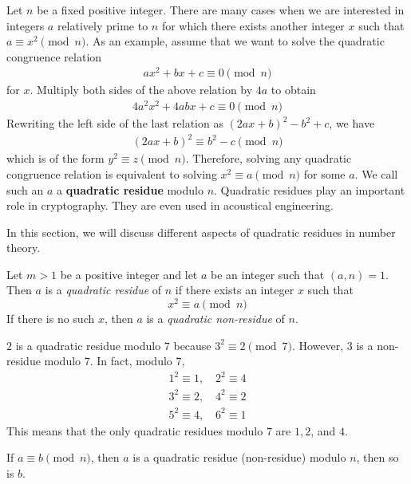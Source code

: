 \documentclass[main.tex]{subfile}
\begin{document}
	Let $n$ be a fixed positive integer. There are many cases when we are interested in integers $a$ relatively prime to $n$ for which there exists another integer $x$ such that $a \equiv x^2 \pmod n$. As an example, assume that we want to solve the quadratic congruence relation
	\begin{align*}
		ax^2 + bx + c \equiv 0 \pmod n
	\end{align*}
	for $x$. Multiply both sides of the above relation by $4a$ to obtain
	\begin{align*}
		4a^2x^2+4abx+c \equiv 0 \pmod n
	\end{align*}
	Rewriting the left side of the last relation as $(2ax+b)^2 -b^2+c$, we have
	\begin{align*}
		(2ax+b)^2 \equiv b^2-c \pmod n
	\end{align*}
	which is of the form $y^2 \equiv z \pmod n$. Therefore, solving any quadratic congruence relation is equivalent to solving $x^2 \equiv a \pmod n$ for some $a$. We call such an $a$ a \textbf{quadratic residue} modulo $n$. Quadratic residues play an important role in cryptography. They are even used in acoustical engineering.

	In this section, we will discuss different aspects of quadratic residues in number theory.

	\begin{definition}
		Let $m>1$ be a positive integer and let $a$ be an integer such that $(a,n)=1$. Then $a$ is a \textit{quadratic residue} of $n$ if there exists an integer $x$ such that
		\[x^2\equiv a\pmod n\]
		If there is no such $x$, then $a$ is a \textit{quadratic non-residue} of $n$.
	\end{definition}

	\begin{example}
		$2$ is a quadratic residue modulo $7$ because $3^2 \equiv 2 \pmod 7$. However, $3$ is a non-residue modulo $7$. In fact, modulo $7$,
		\begin{align*}
			1^2 \equiv 1, \quad 2^2 \equiv 4\\
			3^2 \equiv 2, \quad 4^2 \equiv 2\\
			5^2 \equiv 4, \quad 6^2 \equiv 1
		\end{align*}
		This means that the only quadratic residues modulo $7$ are $1, 2$, and $4$.
	\end{example}

	\begin{corollary}\label{cor:qrequiv}
		If $a \equiv b \pmod n$, then $a$ is a quadratic residue (non-residue) modulo $n$, then so is $b$.
	\end{corollary}
\end{document}
